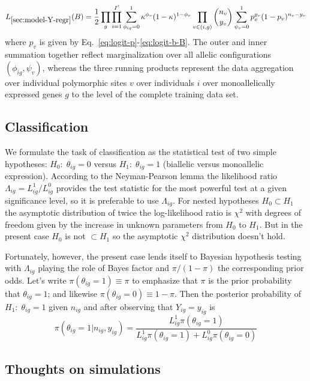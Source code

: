 \documentclass[letterpaper]{article}
\begin{document}
\begin{eqnarray}
L_{\ref{sec:model-Y-regr}}(B) = \frac{1}{2} \prod_{g} \prod_{i=1}^{I'}
\sum_{\phi_{ig}=0}^1 \kappa^{\phi_v} (1 - \kappa)^{1-\phi_v}
\prod_{v\in(i,g)}
\binom{n_v}{y_v}
\sum_{\psi_v=0}^1
p_v^{y_v} (1-p_v)^{n_v-y_v}
\end{eqnarray}
where \(p_v\) is given by Eq.~\ref{eq:logit-p}-\ref{eq:logit-b-B}.  The outer
and inner summation together reflect marginalization over all allelic configurations
\((\phi_{ig},\psi_v)\), whereas the three running products represent the data aggregation
over individual polymorphic sites \(v\) over individuals \(i\) over
monoallelically expressed genes
\(g\) to the level of the complete training data set.

\subsection{Classification}

We formulate the task of classification as the statistical test of two simple
hypotheses: \(H_0:\;\theta_{ig}=0\) versus \(H_1:\;\theta_{ig}=1\) (biallelic versus
monoallelic expression).
According to the
Neyman-Pearson lemma the likelihood ratio \(\Lambda_{ig}=L_{ig}^1/L_{ig}^0\)
provides the test statistic for the most powerful test at a given significance
level, so it is preferable to use \(\Lambda_{ig}\).  For nested hypotheses
\(H_0\subset H_1\) the
asymptotic distribution of twice the log-likelihood ratio is \(\chi^2\) with
degrees of freedom given by the increase in unknown parameters from \(H_0\) to
\(H_1\).  But in the present case \(H_0\) is not \(\subset H_1\) so the
asymptotic \(\chi^2\) distribution doesn't hold.

Fortunately, however, the present case lends itself to Bayesian hypothesis
testing with \(\Lambda_{ig}\) playing the role of Bayes factor and
\(\pi/(1-\pi)\) the corresponding prior odds.  Let's write
\(\pi(\theta_{ig}=1)\equiv\pi\) to emphasize that \(\pi\) is the prior
probability that \(\theta_{ig}=1\); and likewise
\(\pi(\theta_{ig}=0)\equiv1-\pi\).  Then the posterior probability of
\(H_1:\;\theta_{ig}=1\) given \(n_{ig}\) and after observing that
\(Y_{ig}=y_{ig}\) is
\begin{equation}
\pi(\theta_{ig}=1|n_{ig},y_{ig}) =
\frac{L_{ig}^1 \pi(\theta_{ig}=1)}{{L_{ig}^1 \pi(\theta_{ig}=1)} + {L_{ig}^0
\pi(\theta_{ig}=0)}}
\end{equation}

\subsection{Thoughts on simulations}
\end{document}
